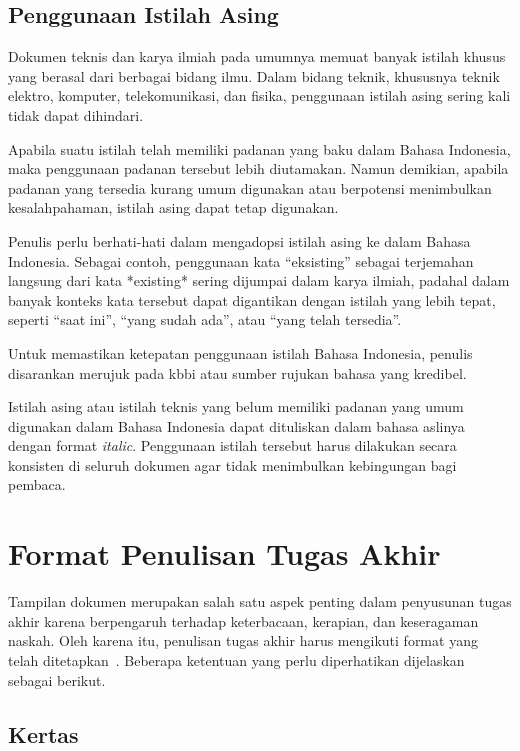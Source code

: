 \subsection{Penggunaan Istilah Asing}
Dokumen teknis dan karya ilmiah pada umumnya memuat banyak istilah khusus yang berasal dari berbagai bidang ilmu. Dalam bidang teknik, khususnya teknik elektro, komputer, telekomunikasi, dan fisika, penggunaan istilah asing sering kali tidak dapat dihindari.

Apabila suatu istilah telah memiliki padanan yang baku dalam Bahasa Indonesia, maka penggunaan padanan tersebut lebih diutamakan. Namun demikian, apabila padanan yang tersedia kurang umum digunakan atau berpotensi menimbulkan kesalahpahaman, istilah asing dapat tetap digunakan.

Penulis perlu berhati-hati dalam mengadopsi istilah asing ke dalam Bahasa Indonesia. Sebagai contoh, penggunaan kata “eksisting” sebagai terjemahan langsung dari kata *existing* sering dijumpai dalam karya ilmiah, padahal dalam banyak konteks kata tersebut dapat digantikan dengan istilah yang lebih tepat, seperti “saat ini”, “yang sudah ada”, atau “yang telah tersedia”.

Untuk memastikan ketepatan penggunaan istilah Bahasa Indonesia, penulis disarankan merujuk pada \gls{kbbi} \cite{KBBI2026} atau sumber rujukan bahasa yang kredibel.

Istilah asing atau istilah teknis yang belum memiliki padanan yang umum digunakan dalam Bahasa Indonesia dapat dituliskan dalam bahasa aslinya dengan format \textit{italic}. Penggunaan istilah tersebut harus dilakukan secara konsisten di seluruh dokumen agar tidak menimbulkan kebingungan bagi pembaca.

\section{Format Penulisan Tugas Akhir}

Tampilan dokumen merupakan salah satu aspek penting dalam penyusunan tugas akhir karena berpengaruh terhadap keterbacaan, kerapian, dan keseragaman naskah. Oleh karena itu, penulisan tugas akhir harus mengikuti format yang telah ditetapkan~\cite{panduanTA2017}. Beberapa ketentuan yang perlu diperhatikan dijelaskan sebagai berikut.

\subsection{Kertas}

